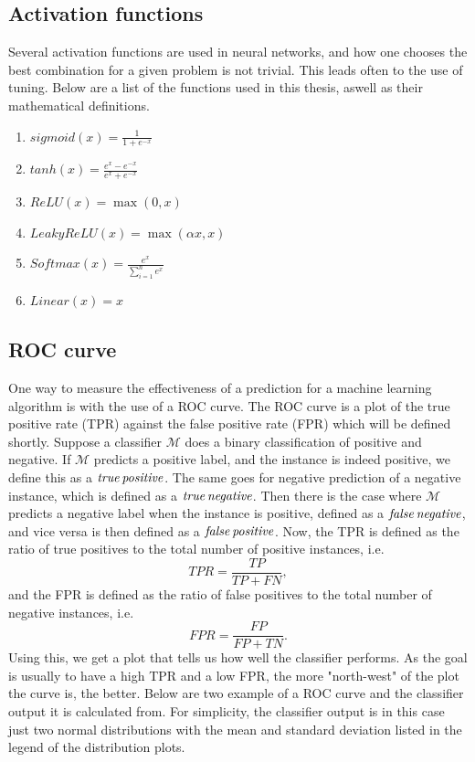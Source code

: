 \subsection*{Activation functions}
Several activation functions are used in neural networks, and how one chooses the best combination for a given problem is not trivial. 
This leads often to the use of tuning. Below are a list of the functions used in this thesis, aswell as their mathematical definitions. 

\begin{enumerate}
    \item  $sigmoid(x) = \frac{1}{1+e^{-x}}$
    \item $tanh(x) = \frac{e^x-e^{-x}}{e^x+e^{-x}}$
    \item $ReLU(x) = \max(0,x)$
    \item $LeakyReLU(x) = \max(\alpha x,x)$
    \item $Softmax(x) = \frac{e^x}{\sum_{i=1}^n e^x}$
    \item $Linear(x) = x$
\end{enumerate}


\subsection*{ROC curve}
One way to measure the effectiveness of a prediction for a machine learning algorithm is with the use of a ROC curve. 
The ROC curve is a plot of the true positive rate (TPR) against the false positive rate (FPR) which will be defined shortly. 
Suppose a classifier $\mathcal{M}$ does a binary classification of positive and negative. If $\mathcal{M}$ predicts a positive 
label, and the instance is indeed positive, we define this as a $\it{true\, positive}$. The same goes for negative prediction of a 
negative instance, which is defined as a $\it{true\, negative}$. Then there is the case where $\mathcal{M}$ predicts a negative label
when the instance is positive, defined as a $\it{false\, negative}$, and vice versa is then defined as a $\it{false\, positive}$\cite{FAWCETT2006861}.
Now, the TPR is defined as the ratio of true positives to the total number of positive instances, i.e. 
\begin{equation*}
    TPR = \frac{TP}{TP+FN},
\end{equation*}
and the FPR is defined as the ratio of false positives to the total number of negative instances, i.e.
\begin{equation*}
    FPR = \frac{FP}{FP+TN}.
\end{equation*}
Using this, we get a plot that tells us how well the classifier performs. As the goal is usually to have a high TPR and a low FPR,
the more "north-west"\cite{FAWCETT2006861} of the plot the curve is, the better. Below are two example of a ROC curve and the classifier output it 
is calculated from. For simplicity, the classifier output is in this case just two normal distributions with the mean and standard deviation 
listed in the legend of the distribution plots.

